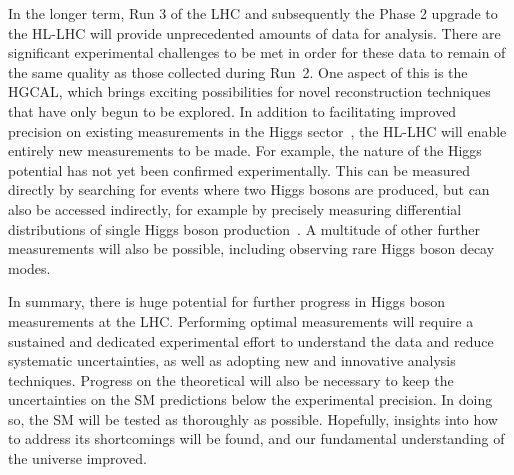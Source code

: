 In the longer term, Run 3 of the LHC and subsequently the Phase 2 upgrade to the HL-LHC 
will provide unprecedented amounts of data for analysis.
There are significant experimental challenges to be met in order for these data 
to remain of the same quality as those collected during Run~2.
One aspect of this is the HGCAL, which brings exciting possibilities for novel reconstruction
techniques that have only begun to be explored.
In addition to facilitating improved precision on existing measurements 
in the Higgs sector~\cite{FutureYR}, the HL-LHC will enable entirely new measurements to be made.
For example, the nature of the Higgs potential has not yet been confirmed experimentally.
This can be measured directly by searching for events where two Higgs bosons are produced, 
but can also be accessed indirectly, 
for example by precisely measuring differential distributions 
of single Higgs boson production~\cite{JonnoPAS}.
A multitude of other further measurements will also be possible, 
including observing rare Higgs boson decay modes.

In summary, there is huge potential for further progress in Higgs boson measurements at the LHC.
Performing optimal measurements will require a sustained and dedicated experimental effort
to understand the data and reduce systematic uncertainties, 
as well as adopting new and innovative analysis techniques.
Progress on the theoretical will also be necessary 
to keep the uncertainties on the SM predictions below the experimental precision.
In doing so, the SM will be tested as thoroughly as possible.
Hopefully, insights into how to address its shortcomings will be found,
and our fundamental understanding of the universe improved.
